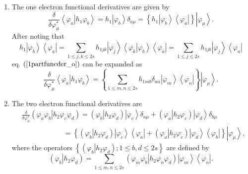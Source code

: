 \documentclass[titlepage]{article}%
\begin{document}
\begin{enumerate}
\item The one electron functional derivatives are given by
\begin{equation}
\frac{\delta}{\delta\varphi_{\mu}^{\ast}}\left\langle \left.  \varphi
_{a}\right\vert h_{1}\varphi_{b}\right\rangle =h_{1}\left\vert \varphi
_{b}\right\rangle \delta_{a\mu}=\left\{  h_{1}\left\vert \varphi
_{b}\right\rangle \left\langle \varphi_{a}\right\vert \right\}  \left\vert
\varphi_{\mu}\right\rangle . \label{1partfuncder_o}%
\end{equation}
After noting that
\begin{equation}
h_{1}\left\vert \varphi_{b}\right\rangle \left\langle \varphi_{a}\right\vert
=\sum_{1\leq j,k\leq2s}h_{1jk}\left\vert \varphi_{j}\right\rangle \left\langle
\left.  \varphi_{k}\right\vert \varphi_{b}\right\rangle \left\langle
\varphi_{a}\right\vert =\sum_{1\leq j\leq2s}h_{1jb}\left\vert \varphi
_{j}\right\rangle \left\langle \varphi_{a}\right\vert
\end{equation}
eq. $\left(  \ref{1partfuncder_o}\right)  $ can be expanded as
\begin{equation}
\frac{\delta}{\delta\varphi_{\mu}^{\ast}}\left\langle \left.  \varphi
_{a}\right\vert h_{1}\varphi_{b}\right\rangle =\left\{  \sum_{1\leq m,n\leq
2s}h_{1mb}\delta_{an}\left\vert \varphi_{m}\right\rangle \left\langle
\varphi_{n}\right\vert \right\}  \left\vert \varphi_{\mu}\right\rangle .
\label{1partfuncder_ex}%
\end{equation}


\item The two electron functional derivatives are
\begin{align}
&  \frac{\delta}{\delta\varphi_{\mu}^{\ast}}\left(  \left.  \varphi_{a}%
\varphi_{b}\right\vert h_{2}\varphi_{c}\varphi_{d}\right)  =\left(  \left.
\varphi_{b}\right\vert h_{2}\varphi_{d}\right)  \left\vert \varphi
_{c}\right\rangle \delta_{a\mu}+\left(  \left.  \varphi_{a}\right\vert
h_{2}\varphi_{c}\right)  \left\vert \varphi_{d}\right\rangle \delta_{b\mu
}\nonumber\\
&  \qquad\qquad\qquad\left.  =\right.  \left\{  \left(  \left.  \varphi
_{b}\right\vert h_{2}\varphi_{d}\right)  \left\vert \varphi_{c}\right\rangle
\left\langle \varphi_{a}\right\vert +\left(  \left.  \varphi_{a}\right\vert
h_{2}\varphi_{c}\right)  \left\vert \varphi_{d}\right\rangle \left\langle
\varphi_{b}\right\vert \right\}  \left\vert \varphi_{\mu}\right\rangle ,
\label{2partfuncder_o}%
\end{align}
where the operators $\left\{  \left(  \left.  \varphi_{b}\right\vert
h_{2}\varphi_{d}\right)  ;1\leq b,d\leq2s\right\}  $ are defined by
\begin{equation}
\left(  \left.  \varphi_{b}\right\vert h_{2}\varphi_{d}\right)  =\sum_{1\leq
m,n\leq2s}\left(  \left.  \varphi_{m}\varphi_{b}\right\vert h_{2}\varphi
_{n}\varphi_{d}\right)  \left\vert \varphi_{m}\right\rangle \left\langle
\varphi_{n}\right\vert .
\end{equation}

\end{enumerate}
\end{document}

